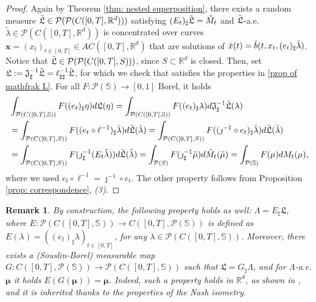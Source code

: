 \documentclass[10pt,leqno]{amsart}
\numberwithin{equation}{section}
\newtheorem{oss}[teorema]{Remark}
\newcommand{\R}{\mathbb{R}}
\newcommand{\PP}{\mathcal{P}}
\newcommand{\Ss}{\mathbb{S}}
\begin{document}
\begin{proof}
Again by Theorem \ref{thm: nested superposition}, there exists a random measure $\Tilde{\mathfrak{L}}\in \PP(\PP(C([0,T],\R^d)))$ satisfying $(E_t)_\sharp\Tilde{\mathfrak{L}} = \tilde{M}_t$ and $\Tilde{\mathfrak{L}}$-a.e. $\tilde\lambda\in \PP(C([0,T],\R^d))$ is concentrated over curves $\boldsymbol{x}= (x_t)_{t\in [0,T]}\in AC([0,T],\R^d)$ that are solutions of $\dot{x}(t) = \Tilde{b}(t,x_t,(e_t)_\sharp\tilde\lambda)$. Notice that $\Tilde{\mathfrak{L}}\in \PP(\PP(C([0,T],S)))$, since $S\subset\R^d$ is closed. Then, set $\mathfrak{L}:= \mathfrak{J}^{-1}_\sharp \Tilde{\mathfrak{L}} = \ell^{-1}_{\sharp\sharp} \Tilde{\mathfrak{L}}$, for which we check that satisfies the properties in \ref{prop of mathfrak L}. For all $F:\PP(\Ss)\to[0,1]$ Borel, it holds
\begin{align*}
    & \int_{\PP(C([0,T],\Ss))}  F((e_t)_\sharp\eta) d\mathfrak{L}(\eta) = \int_{\PP(C([0,T],\Ss))} F((e_t)_\sharp\lambda) d\mathfrak{J}^{-1}_\sharp\Tilde{\mathfrak{L}}(\lambda)
    \\
    &=
    \int_{\PP(C([0,T],S))} F((e_t\circ\ell^{-1})_\sharp \tilde\lambda) d\Tilde{\mathfrak{L}}(\tilde\lambda)
    = 
    \int_{\PP(C([0,T],S))} F((\jmath^{-1}\circ e_t)_\sharp \tilde\lambda) d\Tilde{\mathfrak{L}}(\tilde\lambda)
    \\
    &=
    \int_{\PP(C([0,T],S))} F(\jmath^{-1}_\sharp(E_t\tilde\lambda)) d\Tilde{\mathfrak{L}}(\tilde\lambda)
    = 
    \int_{\PP(S)} F(\jmath^{-1}_\sharp\tilde\mu) d\tilde{M}_t(\tilde\mu)
    =
    \int_{\PP(\Ss)} F(\mu) dM_t(\mu),
\end{align*}
where we used $e_t \circ \ell^{-1} = \jmath^{-1}\circ e_t$. The other property follows from Proposition \ref{prop: correspondence}, \textit{(3)}. \qedhere
\end{proof}

\begin{oss}
    By construction, the following property holds as well: $\Lambda = E_\sharp\mathfrak{L}$, where $E: \PP(C([0,T],\Ss))\to C([0,T],\PP(\Ss))$ is defined as $E(\lambda) = ((e_t)_\sharp\lambda)_{t\in [0,T]}$, for any $\lambda\in \PP(C([0,T],\Ss))$. Moreover, there exists a (Souslin-Borel) measurable map $G:C([0,T],\PP(\Ss)) \to \PP(C([0,T],\Ss))$ such that $\mathfrak{L} = G_\sharp\Lambda$, and for $\Lambda$-a.e. $\boldsymbol{\mu}$ it holds $E(G(\boldsymbol{\mu})) = \boldsymbol{\mu}$. Indeed, such a property holds in $\R^d$, as shown in \cite{pinzisavare2025}, and it is inherited thanks to the properties of the Nash isometry.
\end{oss}
\end{document}

